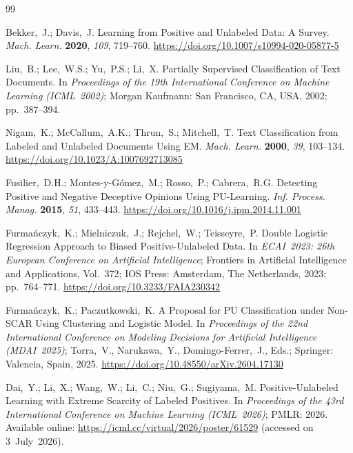 \documentclass[applsci,article,submit,pdftex,moreauthors]{Definitions/mdpi}
\begin{document}
\begin{thebibliography}{99}

Bekker,~J.; Davis,~J.
Learning from Positive and Unlabeled Data: A Survey.
\textit{Mach. Learn.} \textbf{2020}, \textit{109}, 719--760.
\url{https://doi.org/10.1007/s10994-020-05877-5}

Liu,~B.; Lee,~W.S.; Yu,~P.S.; Li,~X.
Partially Supervised Classification of Text Documents.
In \textit{Proceedings of the 19th International Conference on Machine Learning (ICML~2002)};
Morgan Kaufmann: San Francisco, CA, USA, 2002; pp.~387--394.

Nigam,~K.; McCallum,~A.K.; Thrun,~S.; Mitchell,~T.
Text Classification from Labeled and Unlabeled Documents Using EM.
\textit{Mach. Learn.} \textbf{2000}, \textit{39}, 103--134.
\url{https://doi.org/10.1023/A:1007692713085}

Fusilier,~D.H.; Montes-y-G\'{o}mez,~M.; Rosso,~P.; Cabrera,~R.G.
Detecting Positive and Negative Deceptive Opinions Using PU-Learning.
\textit{Inf. Process. Manag.} \textbf{2015}, \textit{51}, 433--443.
\url{https://doi.org/10.1016/j.ipm.2014.11.001}

Furma\'{n}czyk,~K.; Mielniczuk,~J.; Rejchel,~W.; Teisseyre,~P.
Double Logistic Regression Approach to Biased Positive-Unlabeled Data.
In \textit{ECAI~2023: 26th European Conference on Artificial Intelligence};
Frontiers in Artificial Intelligence and Applications, Vol.~372;
IOS Press: Amsterdam, The Netherlands, 2023; pp.~764--771.
\url{https://doi.org/10.3233/FAIA230342}

Furma\'{n}czyk,~K.; Paczutkowski,~K.
A Proposal for PU Classification under Non-SCAR Using Clustering and Logistic Model.
In \textit{Proceedings of the 22nd International Conference on Modeling Decisions
for Artificial Intelligence (MDAI~2025)};
Torra,~V., Narukawa,~Y., Domingo-Ferrer,~J., Eds.;
Springer: Valencia, Spain, 2025.
\url{https://doi.org/10.48550/arXiv.2604.17130}

Dai,~Y.; Li,~X.; Wang,~W.; Li,~C.; Niu,~G.; Sugiyama,~M.
Positive-Unlabeled Learning with Extreme Scarcity of Labeled Positives.
In \textit{Proceedings of the 43rd International Conference on Machine Learning (ICML~2026)};
PMLR: 2026.
Available online: \url{https://icml.cc/virtual/2026/poster/61529} (accessed on 3~July~2026).


\end{thebibliography}
\end{document}
